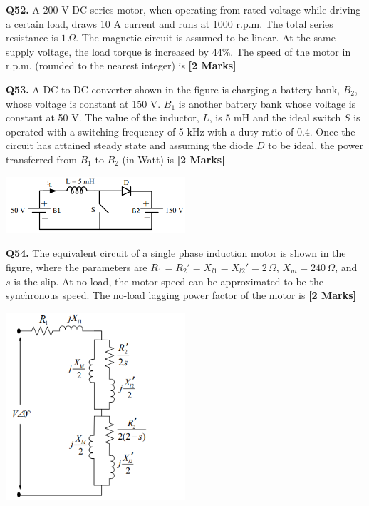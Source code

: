 \documentclass[11pt]{article}
\newcommand{\questionb}[2]{
    \noindent\textbf{Q#2.} #1 \hfill \textbf{[2 Marks]}
}
\begin{document}
\questionb{A 200 V DC series motor, when operating from rated voltage while driving a certain load, draws 10 A current and runs at 1000 r.p.m. The total series resistance is \( 1\, \Omega \). The magnetic circuit is assumed to be linear. At the same supply voltage, the load torque is increased by 44\%. The speed of the motor in r.p.m. (rounded to the nearest integer) is}{52}
\vspace{0.5cm}

\questionb{A DC to DC converter shown in the figure is charging a battery bank, \( B_2 \), whose voltage is constant at 150 V. \( B_1 \) is another battery bank whose voltage is constant at 50 V. The value of the inductor, \( L \), is 5 mH and the ideal switch \( S \) is operated with a switching frequency of 5 kHz with a duty ratio of 0.4. Once the circuit has attained steady state and assuming the diode \( D \) to be ideal, the power transferred from \( B_1 \) to \( B_2 \) (in Watt) is}{53}
\begin{center}
\includegraphics[width=0.5\textwidth]{figures/53.png}
\end{center}
\vspace{0.5cm}

\questionb{The equivalent circuit of a single phase induction motor is shown in the figure, where the parameters are \( R_1 = R_2' = X_{l1} = X_{l2}' = 2\, \Omega \), \( X_m = 240\, \Omega \), and \( s \) is the slip. At no-load, the motor speed can be approximated to be the synchronous speed. The no-load lagging power factor of the motor is}{54}
\begin{center}
\includegraphics[width=0.5\textwidth]{figures/54.png}
\end{center}
\vspace{0.5cm}
\end{document}
